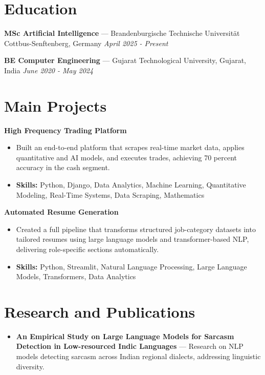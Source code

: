 \documentclass[a4paper,10pt]{article}
\begin{document}
\section*{Education}
\textbf{MSc Artificial Intelligence} — Brandenburgische Technische Universität Cottbus-Senftenberg, Germany \hfill \textit{April 2025 - Present}\par
\vspace{1.5pt}
\textbf{BE Computer Engineering} — Gujarat Technological University, Gujarat, India \hfill \textit{June 2020 - May 2024}\par

\section*{Main Projects}
\textbf{High Frequency Trading Platform}\par
\vspace{1pt}
\begin{itemize}
  \item Built an end-to-end platform that scrapes real-time market data, applies quantitative and AI models, and executes trades, achieving 70 percent accuracy in the cash segment.
  \item \textbf{Skills:} Python, Django, Data Analytics, Machine Learning, Quantitative Modeling, Real-Time Systems, Data Scraping, Mathematics
\end{itemize}
\vspace{3pt}
\textbf{Automated Resume Generation}\par
\vspace{1pt}
\begin{itemize}
  \item Created a full pipeline that transforms structured job-category datasets into tailored resumes using large language models and transformer-based NLP, delivering role-specific sections automatically.
  \item \textbf{Skills:} Python, Streamlit, Natural Language Processing, Large Language Models, Transformers, Data Analytics
\end{itemize}

\section*{Research and Publications}
\begin{itemize}
\item \textbf{An Empirical Study on Large Language Models for Sarcasm Detection in Low-resourced Indic Languages} — Research on NLP models detecting sarcasm across Indian regional dialects, addressing linguistic diversity.
\end{itemize}
\end{document}
